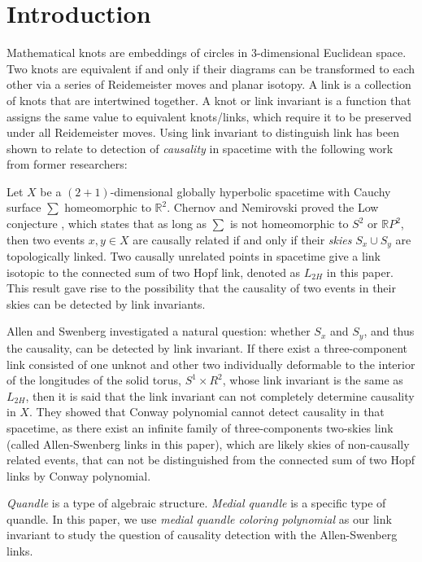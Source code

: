 \documentclass[12pt, letterpaper]{article}
\theoremstyle{plain}
\theoremstyle{definition}
\begin{document}
\section{Introduction} 
Mathematical knots are embeddings of circles in 3-dimensional Euclidean space. Two knots are equivalent if and only if their diagrams can be transformed to each other via a series of Reidemeister moves and planar isotopy. A link is a collection of knots that are intertwined together. A knot or link invariant is a function that assigns the same value to equivalent knots/links, which require it to be preserved under all Reidemeister moves. Using link invariant to distinguish link has been shown to relate to detection of \textit{causality} in spacetime with the following work from former researchers: \par
Let $X$ be a $(2+1)$-dimensional globally hyperbolic spacetime with Cauchy surface $\sum$ homeomorphic to $\mathbb{R}^2$. Chernov and Nemirovski \cite{CN} proved the Low conjecture \cite{L}, which states that as long as $\sum$ is not homeomorphic to $S^2$ or $\mathbb{R}P^2$, then two events $x,y\in X$ are causally related if and only if their \textit{skies} $S_x\cup S_y$ are topologically linked. Two causally unrelated points in spacetime give a link isotopic to the connected sum of two Hopf link, denoted as $L_{2H}$ in this paper. This result gave rise to the possibility that the causality of two events in their skies can be detected by link invariants.\par
 Allen and Swenberg \cite{AS} investigated a natural question: whether $S_x$ and $S_y$, and thus the causality, can be detected by link invariant. If there exist a three-component link consisted of one unknot and other two individually deformable to the interior of the longitudes of the solid torus, $S^1\times R^2$, whose link invariant is the same as $L_{2H}$, then it is said that the link invariant can not completely determine causality in $X$. They showed that Conway polynomial cannot detect causality in that spacetime, as there exist an infinite family of three-components two-skies link (called Allen-Swenberg links in this paper), which are likely skies of non-causally related events, that can not be distinguished from  the connected sum of two Hopf links by Conway polynomial.\par

\textit{Quandle} is a type of algebraic structure. \textit{Medial quandle} is a specific type of quandle. In this paper, we use \textit{medial quandle coloring polynomial} as our link invariant to study the question of causality detection with the Allen-Swenberg links.
 
\end{document}
